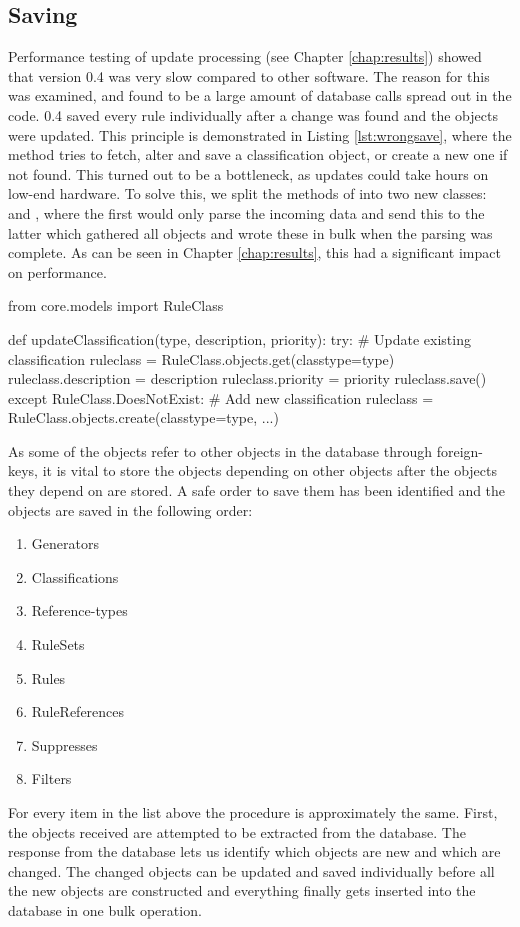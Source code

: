 \subsection{Saving}
\label{sec:saving}

Performance testing of update processing (see Chapter \ref{chap:results}) showed
that \snowman{} version 0.4 was very slow compared to other software. The reason
for this was examined, and found to be a large amount of database calls spread
out in the code. \snowman{} 0.4 saved every rule individually after a change was
found and the objects were updated. This principle is demonstrated in Listing
\ref{lst:wrongsave}, where the method tries to fetch, alter and save a
classification object, or create a new one if not found. This turned out to be a
bottleneck, as updates could take hours on low-end hardware. To solve this, we
split the methods of  into two new classes:
 and , where the first would only
parse the incoming data and send this to the latter which gathered all objects
and wrote these in bulk when the parsing was complete. As can be seen in Chapter
\ref{chap:results}, this had a significant impact on performance.

\begin{python}[caption=Updating a classification in \snowman{}
0.4,label=lst:wrongsave]
from core.models import RuleClass

def updateClassification(type, description, priority):
  try:
    # Update existing classification
    ruleclass = RuleClass.objects.get(classtype=type)
    ruleclass.description = description
    ruleclass.priority = priority
    ruleclass.save()
  except RuleClass.DoesNotExist:
    # Add new classification
    ruleclass = RuleClass.objects.create(classtype=type, ...)
\end{python}
As some of the objects refer to other objects in the
database through foreign-keys, it is vital to store the objects depending on
other objects after the objects they depend on are stored. A safe order to save
them has been identified and the objects are saved in the following order:
\begin{enumerate}
  \item Generators
  \item Classifications
  \item Reference-types
  \item RuleSets
  \item Rules
  \item RuleReferences
  \item Suppresses
  \item Filters
\end{enumerate}

For every item in the list above the procedure is approximately the same.
First, the objects received are attempted to be extracted from the database. The
response from the database lets us identify which objects are new and which are
changed. The changed objects can be updated and saved individually before all
the new objects are constructed and everything finally gets inserted into the
database in one bulk operation.
